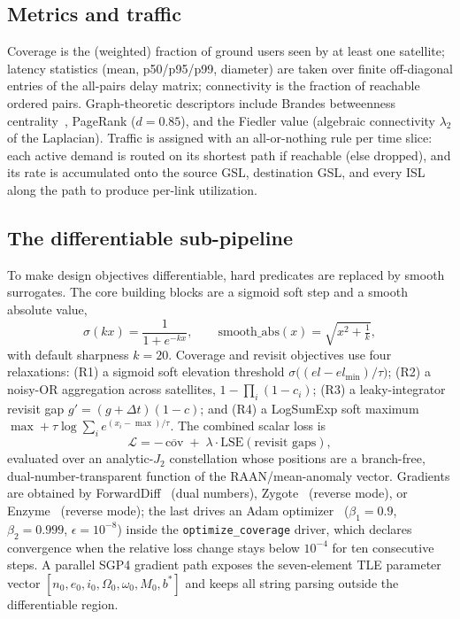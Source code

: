 \documentclass[10pt,twocolumn]{article}
\newcommand{\code}[1]{\texttt{\small #1}}
\begin{document}
\subsection{Metrics and traffic}
Coverage is the (weighted) fraction of ground users seen by at least one
satellite; latency statistics (mean, p50/p95/p99, diameter) are taken over finite
off-diagonal entries of the all-pairs delay matrix; connectivity is the fraction
of reachable ordered pairs. Graph-theoretic descriptors include Brandes
betweenness centrality~\cite{brandes}, PageRank ($d=0.85$), and the Fiedler value
(algebraic connectivity $\lambda_2$ of the Laplacian). Traffic is assigned with an
all-or-nothing rule per time slice: each active demand is routed on its shortest
path if reachable (else dropped), and its rate is accumulated onto the source
GSL, destination GSL, and every ISL along the path to produce per-link
utilization.

\subsection{The differentiable sub-pipeline}\label{sec:diff}
To make design objectives differentiable, hard predicates are replaced by smooth
surrogates. The core building blocks are a sigmoid soft step and a smooth
absolute value,
\begin{equation}
\sigma(kx)=\frac{1}{1+e^{-kx}},\qquad
\mathrm{smooth\_abs}(x)=\sqrt{x^2+\tfrac{1}{k}},
\end{equation}
with default sharpness $k=20$. Coverage and revisit objectives use four
relaxations: (R1) a sigmoid soft elevation threshold
$\sigma\!\big((el-el_{\min})/\tau\big)$; (R2) a noisy-OR aggregation across
satellites, $1-\prod_i(1-c_i)$; (R3) a leaky-integrator revisit gap
$g'=(g+\Delta t)(1-c)$; and (R4) a LogSumExp soft maximum
$\max + \tau\log\sum_i e^{(x_i-\max)/\tau}$. The combined scalar loss is
\begin{equation}
\mathcal{L} = -\,\overline{\text{cov}} \;+\; \lambda \cdot \mathrm{LSE}(\text{revisit gaps}),
\label{eq:covloss}
\end{equation}
evaluated over an analytic-$J_2$ constellation whose positions are a
branch-free, dual-number-transparent function of the RAAN/mean-anomaly vector.
Gradients are obtained by ForwardDiff~\cite{forwarddiff} (dual numbers),
Zygote~\cite{zygote} (reverse mode), or Enzyme~\cite{enzyme} (reverse mode); the
last drives an Adam optimizer~\cite{adam}
($\beta_1{=}0.9$, $\beta_2{=}0.999$, $\epsilon{=}10^{-8}$) inside the
\code{optimize\_coverage} driver, which declares convergence when the relative
loss change stays below $10^{-4}$ for ten consecutive steps. A parallel SGP4
gradient path exposes the seven-element TLE parameter vector
$[n_0,e_0,i_0,\Omega_0,\omega_0,M_0,b^\ast]$ and keeps all string parsing outside
the differentiable region.
\end{document}

